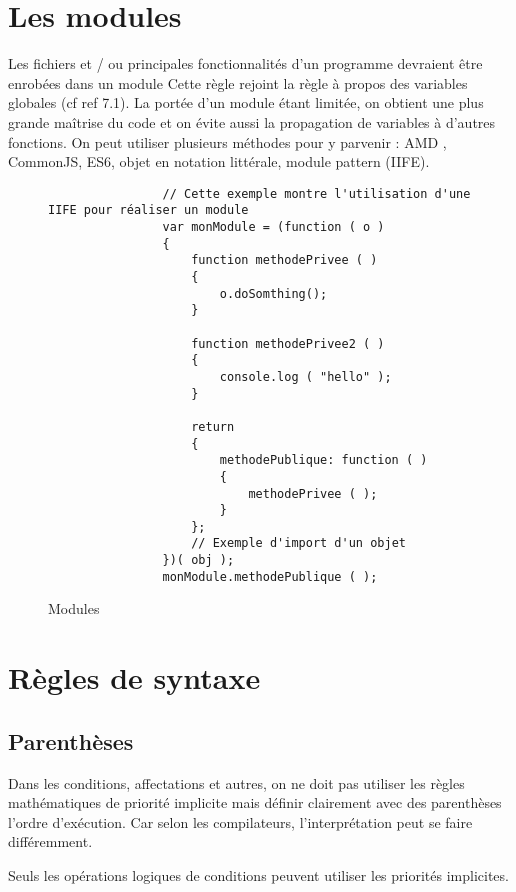 	\section{Les modules}
		Les fichiers et / ou principales fonctionnalités d'un programme devraient être enrobées dans un module Cette règle rejoint la règle à propos des variables globales (cf ref 7.1). La portée d'un module étant limitée, on obtient une plus grande maîtrise du code et on évite aussi la propagation de variables à d'autres fonctions. On peut utiliser plusieurs méthodes pour y parvenir : AMD , CommonJS, ES6, objet en notation littérale, module pattern (IIFE).

		\begin{figure}[H]
			\begin{changemargin}{-2.5cm}{-2.5cm}
			\begin{tcolorbox}
			\begin{verbatim}
				// Cette exemple montre l'utilisation d'une IIFE pour réaliser un module
				var monModule = (function ( o )
				{
				    function methodePrivee ( )
				    {
				        o.doSomthing();
				    }

				    function methodePrivee2 ( )
				    {
				        console.log ( "hello" );
				    }

				    return
				    {
				        methodePublique: function ( )
				        {
				            methodePrivee ( );
				        }
				    };
				    // Exemple d'import d'un objet
				})( obj );
				monModule.methodePublique ( );
			\end{verbatim}
			\end{tcolorbox}
			\end{changemargin}
			\caption{Modules}
		\end{figure}

	\section{Règles de syntaxe}
		\subsection{Parenthèses}
			Dans les conditions, affectations et autres, on ne doit pas utiliser les règles mathématiques de priorité implicite mais définir clairement avec des parenthèses l'ordre d'exécution. Car selon les compilateurs, l'interprétation peut se faire différemment.

			Seuls les opérations logiques de conditions peuvent utiliser les priorités implicites.

